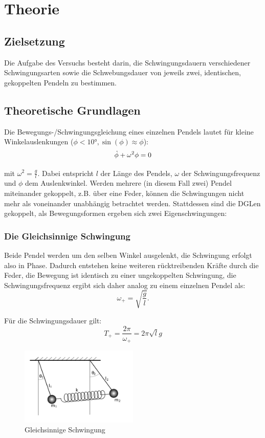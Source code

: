 \section{Theorie}
\label{sec:Theorie}

\subsection{Zielsetzung}
Die Aufgabe des Versuchs besteht darin, die Schwingungsdauern verschiedener
Schwingungsarten sowie die Schwebungsdauer von jeweils zwei, identischen,
gekoppelten Pendeln zu bestimmen.
\subsection{Theoretische Grundlagen}
Die Bewegungs-/Schwingungsgleichung eines einzelnen Pendels lautet für kleine
Winkelauslenkungen ($\phi < \ang{10}, \sin(\phi) \approx \phi$):
\begin{equation}
  \centering
  \dot{\phi}+ \omega^2 \phi = 0
  \label{eqn:schwgl}
\end{equation}

mit $\omega ^2 = \frac{g}{l}.$
Dabei entspricht $l$ der Länge des Pendels, $\omega$ der Schwingungsfrequenz und
$\phi$ dem Auslenkwinkel.
Werden mehrere (in diesem Fall zwei) Pendel miteinander gekoppelt, z.B. über
eine Feder, können die Schwingungen nicht mehr als voneinander unabhängig
betrachtet werden. Stattdessen sind die DGLen gekoppelt, als
Bewegungsformen ergeben sich zwei Eigenschwingungen:

\subsubsection{Die Gleichsinnige Schwingung}

Beide Pendel werden um den selben Winkel \phi ausgelenkt, die Schwingung erfolgt
also in Phase. Dadurch entstehen keine weiteren rücktreibenden Kräfte durch
die Feder, die Bewegung ist identisch zu einer ungekoppelten Schwingung, die
Schwingungsfrequenz ergibt sich daher analog zu einem einzelnen Pendel als:
\begin{equation}
  \omega_+ = \sqrt{\frac{g}{l}}.
  \label{eqn:omega+}
\end{equation}

Für die Schwingungsdauer gilt:
\begin{equation}
T_+ = \frac{2\pi}{\omega_+} = 2\pi \sqrt{l}{g}
\end{equation}
\begin{figure}[H]
  \centering
  \includegraphics[width=0.5\textwidth]{graphics/gleichsinnig.png}
  \caption{Gleichsinnige Schwingung \cite{Wikipedia}}
\end{figure}

